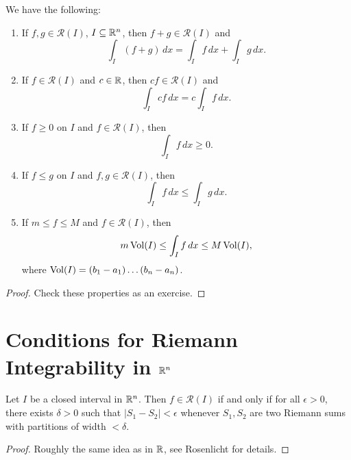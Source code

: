\begin{prop}
  We have the following:
  \begin{enumerate}
    \item If $f, g \in \mathcal{R}(I)$, $I \subseteq \mathbb{R}^n$,
    then $f + g \in \mathcal{R}(I)$ and
    \[
      \int_{I} (f + g)\, dx = \int_{I} f\, dx + \int_{I} g\, dx.
    \]
  \item If $f \in \mathcal{R}(I)$ and $c \in \mathbb{R}$,
    then $cf \in \mathcal{R}(I)$ and
    \[
      \int_{I} cf\, dx = c \int_{I} f\, dx.
    \]
  \item If $f \ge 0$ on $I$ and $f \in \mathcal{R}(I)$,
    then
    \[
      \int_{I} f\, dx \ge 0.
    \]
  \item If $f \le g$ on $I$ and $f, g \in \mathcal{R}(I)$,
    then
    \[
      \int_{I} f\, dx \le \int_{I} g\, dx.
    \]
  \item If $m \le f \le M$ and $f \in \mathcal{R}(I)$, then
    \[
      m \operatorname{Vol}(I) \le \int_{I} f\, dx \le M \operatorname{Vol}(I),
    \]
    where $\operatorname{Vol}(I) = (b_1 - a_1) \dots (b_n - a_n)$.
  \end{enumerate}
\end{prop}

\begin{proof}
  Check these properties as an exercise.
\end{proof}

\section{Conditions for Riemann Integrability in \texorpdfstring{$\mathbb{R}^n$}{Rn}}

\begin{lemma}
  Let $I$ be a closed interval in $\mathbb{R}^n$. Then
  $f \in \mathcal{R}(I)$ if and only if for all
  $\epsilon > 0$, there exists $\delta > 0$ such that
  $|S_1 - S_2| < \epsilon$ whenever $S_1, S_2$ are
  two Riemann sums with partitions
  of width $< \delta$.
\end{lemma}

\begin{proof}
  Roughly the same idea as in $\mathbb{R}$, see Rosenlicht for
  details.
\end{proof}

